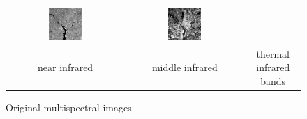 \documentclass[11pt,a4paper]{article}
\begin{document}
\begin{figure}[!htbp]
\begin{tabular}{ccc}
		\includegraphics[width=0.3\textwidth]{pro10/PC/11_38_e}&
		\includegraphics[width=0.3\textwidth]{pro10/PC/11_38_f}\\
		near infrared & middle infrared& thermal infrared bands
	\end{tabular}
	\caption{Original multispectral images}
	\label{pro10_fig2}
\end{figure}
\end{document}
